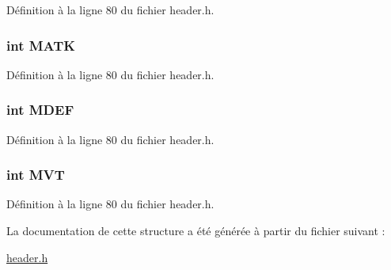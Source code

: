 Définition à la ligne 80 du fichier header.\+h.

\hypertarget{structt__stats_ae183b98dc9aca9905f531bfd4dd51a1c}{
\subsubsection[{M\+A\+T\+K}]{\setlength{\rightskip}{0pt plus 5cm}int M\+A\+T\+K}}\label{structt__stats_ae183b98dc9aca9905f531bfd4dd51a1c}


Définition à la ligne 80 du fichier header.\+h.

\hypertarget{structt__stats_a92ab6d75a95ed209b7875314f53fb555}{
\subsubsection[{M\+D\+E\+F}]{\setlength{\rightskip}{0pt plus 5cm}int M\+D\+E\+F}}\label{structt__stats_a92ab6d75a95ed209b7875314f53fb555}


Définition à la ligne 80 du fichier header.\+h.

\hypertarget{structt__stats_a397f7940443939415a50f324dc5f56f9}{
\subsubsection[{M\+V\+T}]{\setlength{\rightskip}{0pt plus 5cm}int M\+V\+T}}\label{structt__stats_a397f7940443939415a50f324dc5f56f9}


Définition à la ligne 80 du fichier header.\+h.



La documentation de cette structure a été générée à partir du fichier suivant \+:\begin{DoxyCompactItemize}
\item 
\hyperlink{header_8h}{header.\+h}\end{DoxyCompactItemize}
